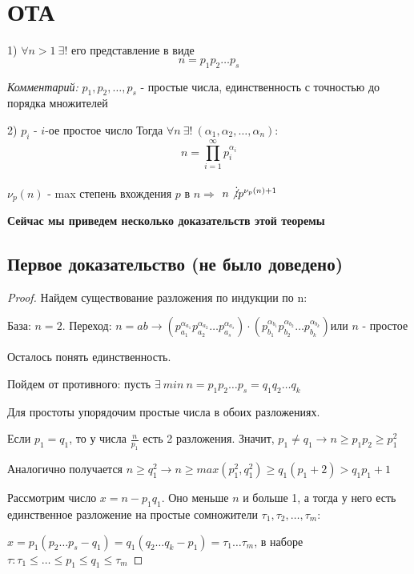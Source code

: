 
\section{ОТА}

\begin{theorem}
  \item[1)]$\forall n > 1 \  \exists!$ его представление в виде $$n = p_1 p_2 \dots p_s$$

  \textit{Комментарий:} $p_1, p_2, \dots, p_s$ - простые числа, единственность с точностью до порядка множителей
  \item[2)] $p_i$ - $i$-ое простое число
  Тогда $\forall n \ \exists! \ (\alpha_1, \alpha_2, \dots, \alpha_n)$:
    $$n = \prod_{i = 1}^{\infty} p_i ^ {\alpha_i}$$
\end{theorem}


\begin{corollary}
  $\nu_p(n)$ - max степень вхождения $p$ в $n \Longrightarrow$
  $n \not \vdots p^{\nu_p(n) + 1}$
\end{corollary}

\textbf{Сейчас мы приведем несколько доказательств этой теоремы}

\subsection{Первое доказательство (не было доведено)}
\begin{proof}
  Найдем существование разложения по индукции по n:

База: $n = 2$. Переход: $n = ab \rightarrow \left(p_{a_1}^{\alpha_{a_1}} p_{a_2}^{\alpha_{a_2}} \dots p_{a_s}^{\alpha_{a_s}}\right) \cdot \left(p_{b_1}^{\alpha_{b_1}} p_{b_2}^{\alpha_{b_2}} \dots p_{b_k}^{\alpha_{b_k}}\right) \text{или $n$ - простое} $

Осталось понять единственность.

Пойдем от противного: пусть $\exists \ min \ n = p_1 p_2 \dots p_s = q_1 q_2 \dots q_k$

Для простоты упорядочим простые числа в обоих разложениях.

Если $p_1 = q_1$, то у числа $\frac{n}{p_1}$ есть 2 разложения. Значит, $p_1 \ne q_1 \to n \geq p_1 p_2 \geq p_1^2$

Аналогично получается $n \ge q_1^2 \rightarrow n \ge max(p_1^2, q_1^2) \ge q_1(p_1 + 2) > q_1p_1 + 1$

Рассмотрим число $x = n - p_1 q_1$. Оно меньше $n$ и больше 1, а тогда у него есть единственное разложение на простые сомножители $\tau_1, \tau_2, \dots, \tau_m$:

$x = p_1(p_2\dots p_s - q_1) = q_1(q_2 \dots q_k - p_1) = \tau_1 \dots \tau_m$, в наборе $\tau: \tau_1 \le \dots \le p_1 \le q_1 \le \tau_m$
\end{proof}

